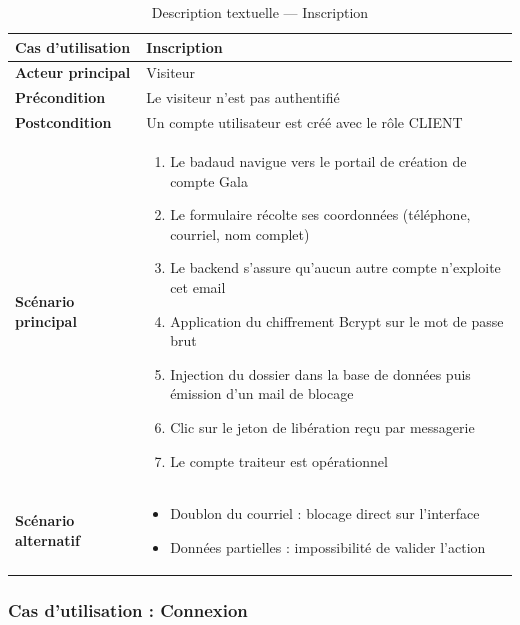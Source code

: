 \begin{table}[H]
    \centering
    \caption{Description textuelle --- Inscription}
    \label{tab:desc_inscription}
    \renewcommand{\arraystretch}{1.3}
    \begin{tabular}{|p{4cm}|p{8.5cm}|}
        \hline
        \textbf{Cas d'utilisation} & Inscription \\
        \hline
        \textbf{Acteur principal} & Visiteur \\
        \hline
        \textbf{Précondition} & Le visiteur n'est pas authentifié \\
        \hline
        \textbf{Postcondition} & Un compte utilisateur est créé avec le rôle CLIENT \\
        \hline
        \textbf{Scénario principal} &
        \begin{enumerate}
            \item Le badaud navigue vers le portail de création de compte Gala
            \item Le formulaire récolte ses coordonnées (téléphone, courriel, nom complet)
            \item Le backend s'assure qu'aucun autre compte n'exploite cet email
            \item Application du chiffrement Bcrypt sur le mot de passe brut
            \item Injection du dossier dans la base de données puis émission d'un mail de blocage
            \item Clic sur le jeton de libération reçu par messagerie
            \item Le compte traiteur est opérationnel
        \end{enumerate} \\
        \hline
        \textbf{Scénario alternatif} &
        \begin{itemize}
            \item[3a.] Doublon du courriel : blocage direct sur l'interface
            \item[2a.] Données partielles : impossibilité de valider l'action
        \end{itemize} \\
        \hline
    \end{tabular}
\end{table}

\subsubsection{Cas d'utilisation : Connexion}

